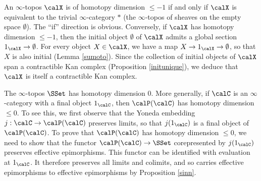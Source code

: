 \begin{example}
An $\infty$-topos $\calX$ is of homotopy
dimension $\leq -1$ if and only if $\calX$ is equivalent to
the trivial $\infty$-category $\ast$ (the $\infty$-topos of sheaves on the empty space
$\emptyset$). The ``if'' direction is obvious. Conversely, if $\calX$ has homotopy dimension
$\leq -1$, then the initial object $\emptyset$ of $\calX$ admits a global section
$1_{\calX} \rightarrow \emptyset$. For every object $X \in \calX$, we have a map
$X \rightarrow 1_{\calX} \rightarrow \emptyset$, so that $X$ is also initial (Lemma \ref{sumoto}).
Since the collection of initial objects of $\calX$ span a contractible Kan complex (Proposition \ref{initunique}), we deduce that $\calX$ is itself a contractible Kan complex.
\end{example}

\begin{example}\label{honeypie}
The $\infty$-topos $\SSet$ has homotopy dimension $0$. 
More generally, if $\calC$ is an $\infty$-category with a final object $1_{\calC}$, then
$\calP(\calC)$ has homotopy dimension $\leq 0$. To see this, we first observe that the Yoneda embedding $j: \calC \rightarrow \calP(\calC)$ preserves limits, so that $j(1_{\calC})$ is a final object of $\calP(\calC)$. To prove that $\calP(\calC)$ has homotopy dimension $\leq 0$, we need to show that the functor $\calP(\calC) \rightarrow \SSet$ corepresented by $j(1_{\calC})$ preserves
effective epimorphisms. This functor can be identified with evaluation at $1_{\calC}$. It therefore preserves all limits and colimits, and so carries effective epimorphisms to effective epimorphisms by Proposition \ref{sinn}.
\end{example}

